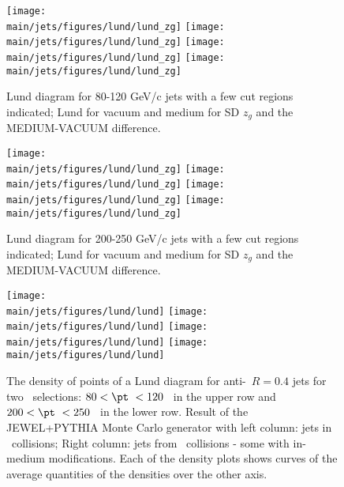 \begin{figure}[htbp]
	\centering
	\texttt{[image: \\main/jets/figures/lund/lund\_zg]}
	\texttt{[image: \\main/jets/figures/lund/lund\_zg]}
	\texttt{[image: \\main/jets/figures/lund/lund\_zg]}
	\texttt{[image: \\main/jets/figures/lund/lund\_zg]}
	\caption{Lund diagram for 80-120 GeV/c jets with a few cut regions indicated; Lund for vacuum and medium for SD $z_{g}$ and the MEDIUM-VACUUM difference.}
	\label{fig:Lund_zg_lowpt}
\end{figure}

\begin{figure}[htbp]
	\centering
	\texttt{[image: \\main/jets/figures/lund/lund\_zg]}
	\texttt{[image: \\main/jets/figures/lund/lund\_zg]}
	\texttt{[image: \\main/jets/figures/lund/lund\_zg]}
	\texttt{[image: \\main/jets/figures/lund/lund\_zg]}
	\caption{Lund diagram for 200-250 GeV/c jets with a few cut regions indicated; Lund for vacuum and medium for SD $z_{g}$ and the MEDIUM-VACUUM difference.}
	\label{fig:Lund_zg_highpt}
\end{figure}


\begin{figure}[htbp]
	\centering
	\texttt{[image: \\main/jets/figures/lund/lund]}
	\texttt{[image: \\main/jets/figures/lund/lund]}
	\texttt{[image: \\main/jets/figures/lund/lund]}
	\texttt{[image: \\main/jets/figures/lund/lund]}
	\caption{The density of points of a Lund diagram for anti-\kT\ $R=0.4$ jets for two \pt\ selections: $80 < \pt\ < 120$ \gevc\ in the upper row and $200 < \pt\ < 250$ \gevc\ in the lower row. Result of the JEWEL+PYTHIA Monte Carlo generator with left column: jets in \pp\ collisions; Right column: jets from \PbPb\ collisions - some with in-medium modifications. Each of the density plots shows curves of the average quantities of the densities over the other axis.}
	\label{fig:Lund_jets}
\end{figure}
